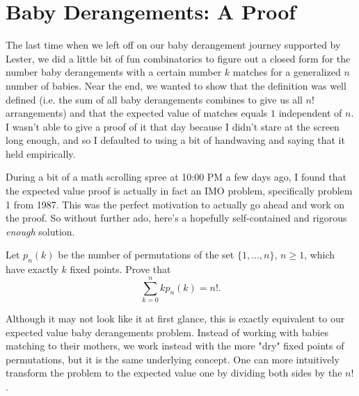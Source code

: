 \section{Baby Derangements: A Proof}

The last time when we left off on our baby derangement journey supported by
Lester, we did a little bit of fun combinatorics to figure out a closed form
for the number baby derangements with a certain number \( k \) matches for a
generalized \( n \) number of babies. Near the end, we wanted to show that the
definition was well defined (i.e. the sum of all baby derangements combines to
give us all \( n! \) arrangements) and that the expected value of matches
equals \( 1 \) independent of \( n \). I wasn't able to give a proof of it that
day because I didn't stare at the screen long enough, and so I defaulted to
using a bit of handwaving and saying that it held empirically.

During a bit of a math scrolling spree at 10:00 PM a few days ago, I found that
the expected value proof is actually in fact an IMO problem, specifically
problem 1 from 1987.  This was the perfect
motivation to actually go ahead and work on the proof. So without further
ado, here's a hopefully self-contained and rigorous \textit{enough}
solution.

\begin{blackbox}
    \begin{problem}[IMO 1987 \#1]
        Let \( p_n (k) \) be the number of permutations of the set \( \{1,
        \ldots, n\} \), \( n \geqslant 1 \), which have exactly \( k \) fixed
        points. Prove that
        \[
            \sum_{k = 0}^{n} k p_n (k) = n!
        .\]
    \end{problem}
\end{blackbox}

Although it may not look like it at first glance, this is exactly equivalent to
our expected value baby derangements problem. Instead of working with babies
matching to their mothers, we work instead with the more "dry" fixed points of
permutations, but it is the same underlying concept. One can more intuitively
transform the problem to the expected value one by dividing both sides by the
\( n! \).

